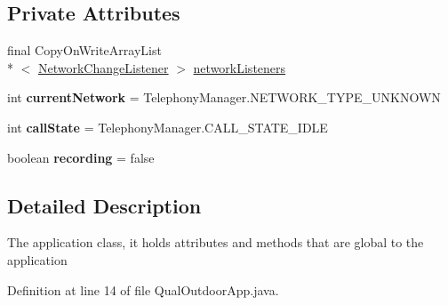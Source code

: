 \subsection*{Private Attributes}
\begin{DoxyCompactItemize}
\item 
final Copy\-On\-Write\-Array\-List\\*
$<$ \hyperlink{interfacecom_1_1qualoutdoor_1_1recorder_1_1QualOutdoorApp_1_1NetworkChangeListener}{Network\-Change\-Listener} $>$ \hyperlink{classcom_1_1qualoutdoor_1_1recorder_1_1QualOutdoorApp_a355e77531ef176519c95f6d179a97889}{network\-Listeners}
\item 
\hypertarget{classcom_1_1qualoutdoor_1_1recorder_1_1QualOutdoorApp_a723c6a6184bda3f001148ae37fc3f230}{int {\bfseries current\-Network} = Telephony\-Manager.\-N\-E\-T\-W\-O\-R\-K\-\_\-\-T\-Y\-P\-E\-\_\-\-U\-N\-K\-N\-O\-W\-N}\label{classcom_1_1qualoutdoor_1_1recorder_1_1QualOutdoorApp_a723c6a6184bda3f001148ae37fc3f230}

\item 
\hypertarget{classcom_1_1qualoutdoor_1_1recorder_1_1QualOutdoorApp_a358eaab2d4ac7f4de7bfc440abe1d149}{int {\bfseries call\-State} = Telephony\-Manager.\-C\-A\-L\-L\-\_\-\-S\-T\-A\-T\-E\-\_\-\-I\-D\-L\-E}\label{classcom_1_1qualoutdoor_1_1recorder_1_1QualOutdoorApp_a358eaab2d4ac7f4de7bfc440abe1d149}

\item 
\hypertarget{classcom_1_1qualoutdoor_1_1recorder_1_1QualOutdoorApp_a3ccdb482ddb310afd4dcad402c513dae}{boolean {\bfseries recording} = false}\label{classcom_1_1qualoutdoor_1_1recorder_1_1QualOutdoorApp_a3ccdb482ddb310afd4dcad402c513dae}

\end{DoxyCompactItemize}


\subsection{Detailed Description}
The application class, it holds attributes and methods that are global to the application 

Definition at line 14 of file Qual\-Outdoor\-App.\-java.



